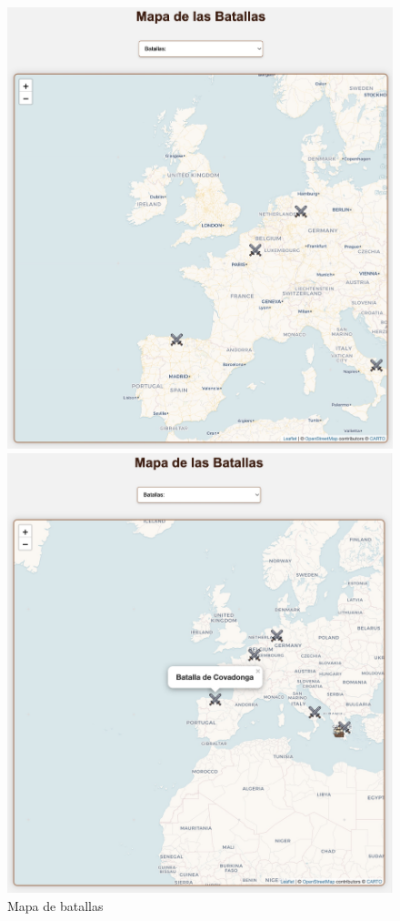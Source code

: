 \documentclass{article}
\begin{document}
\begin{figure}[H]
    \centering
    \begin{minipage}{0.49\textwidth}
        \includegraphics[width=\linewidth]{jsFotos/mapaJS.jpg}
        \caption{Mapa de batallas}
        \label{fig:foro_interface}
    \end{minipage}\hfill
    \begin{minipage}{0.49\textwidth}
        \includegraphics[width=\linewidth]{jsFotos/mapaMouseOver.jpg}

\end{minipage}
\end{figure}
\end{document}
